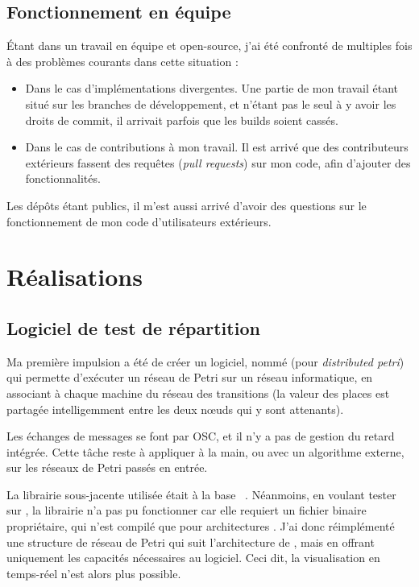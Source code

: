 \subsection{Fonctionnement en équipe}
Étant dans un travail en équipe et open-source, j'ai été confronté de multiples fois à des problèmes courants dans cette situation : 

\begin{itemize}
	\item Dans le cas d'implémentations divergentes. Une partie de mon travail étant situé sur les branches de développement, et n'étant pas le seul à y avoir les droits de commit, il arrivait parfois que les builds soient cassés.
	\item Dans le cas de contributions à mon travail. Il est arrivé que des contributeurs extérieurs fassent des requêtes (\textit{pull requests}) sur mon code, afin d'ajouter des fonctionnalités.
\end{itemize}

Les dépôts étant publics, il m'est aussi arrivé d'avoir des questions sur le fonctionnement de mon code d'utilisateurs extérieurs.

\section{Réalisations}
\subsection{Logiciel de test de répartition}
Ma première impulsion a été de créer un logiciel, nommé  (pour \textit{distributed petri}) qui permette d'exécuter un réseau de Petri sur un réseau informatique, en associant à chaque machine du réseau des transitions (la valeur des places est partagée intelligemment entre les deux nœuds qui y sont attenants).

Les échanges de messages se font par \ac{OSC}, et il n'y a pas de gestion du retard intégrée. Cette tâche reste à appliquer à la main, ou avec un algorithme externe, sur les réseaux de Petri passés en entrée.

La librairie sous-jacente utilisée était à la base ~\cite{lohmann2009petri}. Néanmoins, en voulant tester sur , la librairie n'a pas pu fonctionner car elle requiert un fichier binaire propriétaire, qui n'est compilé que pour architectures . J'ai donc réimplémenté une structure de réseau de Petri qui suit l'architecture de , mais en offrant uniquement les capacités nécessaires au logiciel. Ceci dit, la visualisation en temps-réel n'est alors plus possible.

